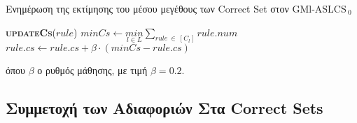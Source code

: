 \begin{algorithm} 
 \caption{Ενημέρωση της εκτίμησης του μέσου μεγέθους των Correct Set στον GMl-ASLCS$_{\:0}$}
\label{alg:gmlaslcs0UpdateCs}
 \begin{algorithmic}[1]
  	\STATE \textbf{\textsc{updateCs}}($rule$)
	\STATE $minCs \gets \underset{l \in L}{min} \sum\limits_{rule \:\in\: [C_{l}]} rule.num$
	\STATE $rule.cs \gets rule.cs + \beta \cdot (minCs - rule.cs)$

 \end{algorithmic}
\end{algorithm}
όπου $\beta$ ο ρυθμός μάθησης, με τιμή $\beta = 0.2$.








\subsection{Συμμετοχή των Αδιαφοριών Στα Correct Sets}
\label{subsec:correctSetsIndiference}
